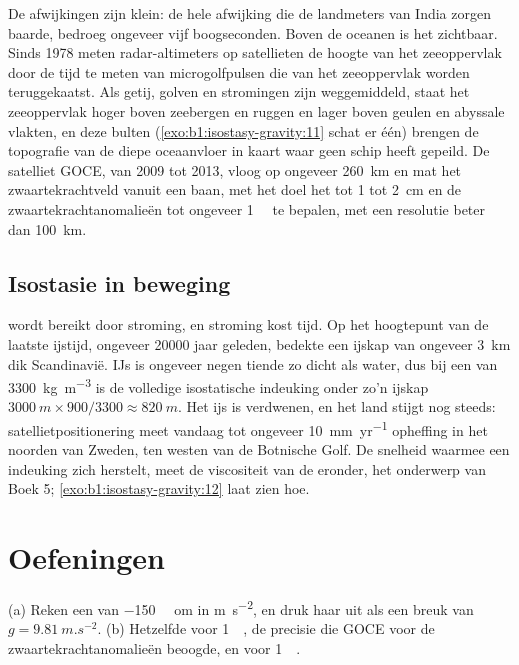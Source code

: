 De afwijkingen zijn klein: de hele afwijking die de landmeters van India zorgen baarde, bedroeg ongeveer vijf boogseconden. Boven de oceanen is het  zichtbaar. Sinds 1978 meten radar-altimeters op satellieten de hoogte van het zeeoppervlak door de tijd te meten van microgolfpulsen die van het zeeoppervlak worden teruggekaatst. Als getij, golven en stromingen zijn weggemiddeld, staat het zeeoppervlak hoger boven zeebergen en ruggen en lager boven geulen en abyssale vlakten, en deze bulten (\cref{exo:b1:isostasy-gravity:11} schat er één) brengen de topografie van de diepe oceaanvloer in kaart waar geen schip heeft gepeild. De satelliet GOCE, van 2009 tot 2013, vloog op ongeveer \qty{260}{km} en mat het zwaartekrachtveld vanuit een baan, met het doel het  tot 1 tot \qty{2}{cm} en de zwaartekrachtanomalieën tot ongeveer \qty{1}{\milli\gal} te bepalen, met een resolutie beter dan \qty{100}{km}.

\subsection*{Isostasie in beweging}

 wordt bereikt door stroming, en stroming kost tijd. Op het hoogtepunt van de laatste ijstijd, ongeveer \num{20000} jaar geleden, bedekte een ijskap van ongeveer \qty{3}{km} dik Scandinavië. IJs is ongeveer negen tiende zo dicht als water, dus bij een  van \qty{3300}{kg.m^{-3}} is de volledige isostatische indeuking onder zo'n ijskap $\qty{3000}{m}\times900/3300 \approx \qty{820}{m}$. Het ijs is verdwenen, en het land stijgt nog steeds: satellietpositionering meet vandaag tot ongeveer \qty{10}{mm.yr^{-1}} opheffing in het noorden van Zweden, ten westen van de Botnische Golf. De snelheid waarmee een indeuking zich herstelt, meet de viscositeit van de  eronder, het onderwerp van Boek 5; \cref{exo:b1:isostasy-gravity:12} laat zien hoe.

\section{Oefeningen}

\begin{exercise}[$\star$]\label{exo:b1:isostasy-gravity:1}
(a) Reken een  van \qty{-150}{\milli\gal} om in \unit{m.s^{-2}}, en druk haar uit als een breuk van $g = \qty{9.81}{m.s^{-2}}$. (b) Hetzelfde voor \qty{1}{\milli\gal}, de precisie die GOCE voor de zwaartekrachtanomalieën beoogde, en voor \qty{1}{\micro\gal}.
\end{exercise}

